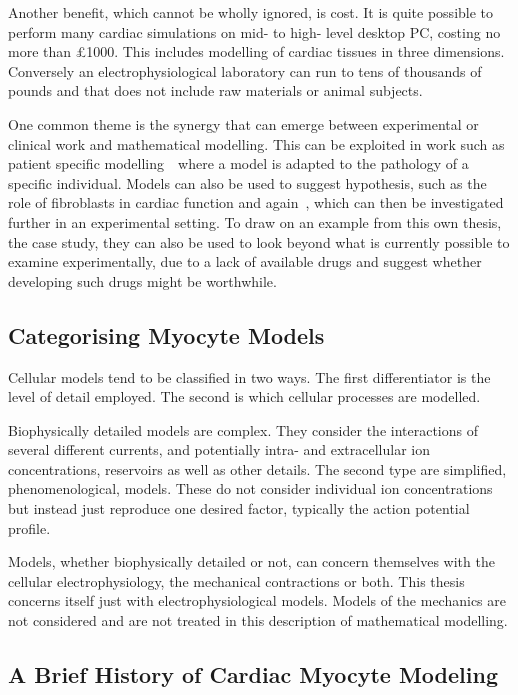 Another benefit, which cannot be wholly ignored, is cost.
It is quite possible to perform many cardiac simulations on mid- to high- level
desktop PC, costing no more than \pounds 1000.
This includes modelling of cardiac tissues in three dimensions.
Conversely an electrophysiological laboratory can run to tens of thousands of
pounds and that does not include raw materials or animal subjects.

One common theme is the synergy that can emerge between experimental or clinical
work and mathematical modelling.
This can be exploited in work such as patient specific
modelling~\cite{Sermesant2006,Ramanathan2006}\ where a model is adapted to the pathology of a
specific individual.
Models can also be used to suggest hypothesis, such as the role of fibroblasts
in cardiac function and again~\cite{Kohl2005}, which can then be investigated
further in an experimental setting.
To draw on an example from this own thesis, the  case study, they can
also be used to look beyond what is currently possible to examine
experimentally, due to a lack of available drugs and suggest whether developing
such drugs might be worthwhile.

\subsection{Categorising Myocyte Models}

Cellular models tend to be classified in two ways.
The first differentiator is the level of detail employed.
The second is which cellular processes are modelled.

Biophysically detailed models are complex.
They consider the interactions of several different currents, and potentially
intra- and extracellular ion concentrations, reservoirs as well as other
details.
The second type are simplified, phenomenological, models.
These do not consider individual ion concentrations but instead just reproduce
one desired factor, typically the action potential profile.

Models, whether biophysically detailed or not, can concern themselves with the
cellular electrophysiology, the mechanical contractions or both.
This thesis concerns itself just with electrophysiological models.
Models of the mechanics are not considered and are not treated in this
description of mathematical modelling.

\subsection{A Brief History of Cardiac Myocyte Modeling}

